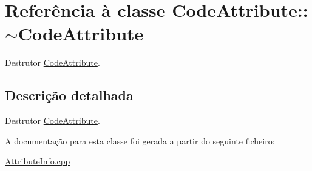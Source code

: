 \hypertarget{class_code_attribute_1_1~_code_attribute}{}\section{Referência à classe Code\+Attribute\+:\+:$\sim$\+Code\+Attribute}
\label{class_code_attribute_1_1~_code_attribute}


Destrutor \hyperlink{class_code_attribute}{Code\+Attribute}.  




\subsection{Descrição detalhada}
Destrutor \hyperlink{class_code_attribute}{Code\+Attribute}. 

A documentação para esta classe foi gerada a partir do seguinte ficheiro\+:\begin{DoxyCompactItemize}
\item 
\hyperlink{_attribute_info_8cpp}{Attribute\+Info.\+cpp}\end{DoxyCompactItemize}
